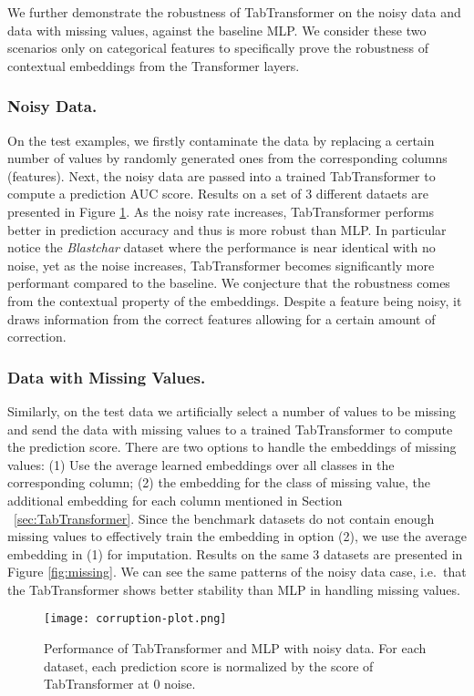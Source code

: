 We further demonstrate the robustness of TabTransformer on the noisy data and data with missing values, against the baseline MLP. We consider these two scenarios only on categorical features to specifically prove the robustness of contextual embeddings from the Transformer layers. 

\subsubsection{Noisy Data.} On the test examples, we firstly contaminate the data by replacing a certain number of values by randomly generated ones from the corresponding columns (features). Next, the noisy data are passed into a trained TabTransformer to compute a prediction AUC score. Results on a set of 3 different dataets are presented in Figure \ref{fig:contamination}. As the noisy rate increases, TabTransformer performs better in prediction accuracy and thus is more robust than MLP. In particular notice the \emph{Blastchar} dataset where the performance is near identical with no noise, yet as the noise increases, TabTransformer becomes significantly more performant compared to the baseline.
We conjecture that the robustness comes from the contextual property of the embeddings. Despite a feature being noisy, it draws information from the correct features allowing for a certain amount of correction.

\subsubsection{Data with Missing Values.} Similarly, on the test data we artificially select a number of values to be missing and send the data with missing values to a trained TabTransformer to compute the prediction score. There are two options to handle the embeddings of missing values: (1) Use the average learned embeddings over all classes in the corresponding column; (2) the embedding for the class of missing value, the additional embedding for each column mentioned in Section ~\ref{sec:TabTransformer}. Since the benchmark datasets do not contain enough missing values to effectively train the embedding in option (2), we use the average embedding in (1) for imputation. Results on the same 3 datasets are presented in Figure \ref{fig:missing}. We can see the same patterns of the noisy data case, i.e.\ that the TabTransformer shows better stability than MLP in handling missing values.

\begin{figure}[h]
\centering
\texttt{[image: corruption-plot.png]} %
\caption{Performance of TabTransformer and MLP with noisy data. For each dataset, each prediction score is normalized by the score of TabTransformer at $0$ noise. 
}
\label{fig:contamination}
\end{figure}

